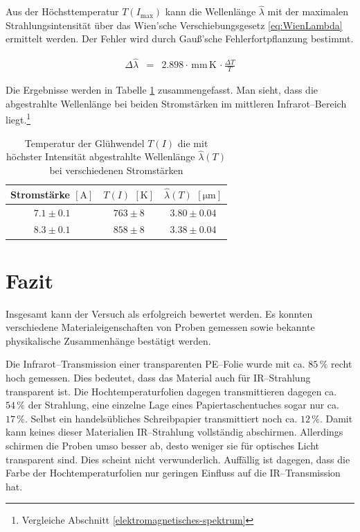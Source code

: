 \documentclass[12pt,a4paper]{scrartcl}
\numberwithin{equation}{section} %
\begin{document}
Aus der Höchsttemperatur $T(I_\mathrm{max})$ kann die Wellenlänge $\hat \lambda$ mit der maximalen Strahlungsintensität über das Wien'sche Verschiebungsgesetz \eqref{eq:WienLambda} ermittelt werden. Der Fehler wird durch Gauß'sche Fehlerfortpflanzung bestimmt.

\begin{eqnarray}
	\Delta \hat  \lambda &= & 2.898 \cdot \mathrm{\,mm\,K\,}\cdot \frac{\Delta T}{{T}}
\end{eqnarray}

\noindent
Die Ergebnisse werden in Tabelle \ref{tab:Höchsttemperatur} zusammengefasst. Man sieht, dass die abgestrahlte Wellenlänge bei beiden Stromstärken im mittleren Infrarot--Bereich liegt.\footnote{Vergleiche Abschnitt \ref{elektromagnetisches-spektrum}}

\begin{table}[h!]
	\centering
	\begin{tabular}{c|c|c}
		Stromstärke $[\mathrm{A}]$ & $T(I)$ $[\mathrm{K}]$ & $\hat \lambda(T)$ $[\mathrm{\mu m}]$ \\
		\hline
		$7.1 \pm 0.1$ & $763 \pm 8$ & $ 3.80 \pm 0.04$  \\
		$8.3 \pm 0.1$ & $858 \pm 8$ & $ 3.38 \pm 0.04$  \\
	\end{tabular}
	\caption{Temperatur der Glühwendel $T(I)$ die mit höchster Intensität abgestrahlte Wellenlänge $\hat\lambda(T)$ bei verschiedenen Stromstärken}
	\label{tab:Höchsttemperatur}
\end{table}

\clearpage
\hypertarget{fazit}{%
\section{Fazit}\label{fazit}}
Insgesamt kann der Versuch als erfolgreich bewertet werden. Es konnten verschiedene Materialeigenschaften von Proben gemessen sowie bekannte physikalische Zusammenhänge bestätigt werden.

Die Infrarot--Transmission einer transparenten PE--Folie wurde mit ca. $85\,\%$ recht hoch gemessen. Dies bedeutet, dass das Material auch für IR--Strahlung transparent ist. Die Hochtemperaturfolien dagegen transmittieren dagegen ca. $54\,\%$ der Strahlung, eine einzelne Lage eines Papiertaschentuches sogar nur ca. $17\,\%$. Selbst ein handelsübliches Schreibpapier transmittiert noch ca. $12\,\%$. Damit kann keines dieser Materialien IR--Strahlung vollständig abschirmen. Allerdings schirmen die Proben umso besser ab, desto weniger sie für optisches Licht transparent sind. Dies scheint nicht verwunderlich. Auffällig ist dagegen, dass die Farbe der Hochtemperaturfolien nur geringen Einfluss auf die IR--Transmission hat.
\end{document}
